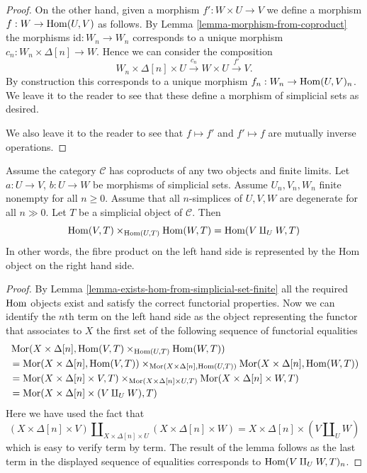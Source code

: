 \begin{proof}
\medskip\noindent
On the other hand, given a morphism
$f' : W \times U \to V$ we define
a morphism $f : W \to \mathop{\mathrm{Hom}}\nolimits(U, V)$
as follows. By Lemma \ref{lemma-morphism-from-coproduct} the morphisms
$\text{id} : W_n \to W_n$ corresponds to a unique
morphism $c_n : W_n \times \Delta[n] \to W$.
Hence we can consider the composition
$$
W_n \times \Delta[n] \times U
\xrightarrow{c_n}
W \times U
\xrightarrow{f'}
V.
$$
By construction this corresponds to a unique morphism
$f_n : W_n \to \mathop{\mathrm{Hom}}\nolimits(U, V)_n$. We leave it to the reader
to see that these define a morphism of simplicial sets as
desired.

\medskip\noindent
We also leave it to the reader to see that
$f \mapsto f'$ and $f' \mapsto f$ are mutually inverse
operations.
\end{proof}

\begin{lemma}
\label{lemma-hom-from-coprod}
Assume the category $\mathcal{C}$
has coproducts of any two objects and finite
limits. Let $a : U \to V$, $b : U \to W$
be morphisms of simplicial sets.
Assume $U_n, V_n, W_n$ finite nonempty for all $n \geq 0$.
Assume that all $n$-simplices of $U, V, W$
are degenerate for all $n \gg 0$.
Let $T$ be a simplicial object of $\mathcal{C}$.
Then
$$
\mathop{\mathrm{Hom}}\nolimits(V, T) \times_{\mathop{\mathrm{Hom}}\nolimits(U, T)} \mathop{\mathrm{Hom}}\nolimits(W, T)
=
\mathop{\mathrm{Hom}}\nolimits(V \amalg_U W, T)
$$
In other words, the fibre product on the left hand
side is represented by the Hom object on the right hand side.
\end{lemma}

\begin{proof}
By Lemma \ref{lemma-exists-hom-from-simplicial-set-finite}
all the required $\mathop{\mathrm{Hom}}\nolimits$ objects exist and satisfy the
correct functorial properties. Now we can identify
the $n$th term on the left hand side as the object
representing the functor that associates to $X$
the first set of the following sequence of functorial
equalities
\begin{align*}
&
\mathop{\mathrm{Mor}}\nolimits(X \times \Delta[n],
\mathop{\mathrm{Hom}}\nolimits(V, T) \times_{\mathop{\mathrm{Hom}}\nolimits(U, T)} \mathop{\mathrm{Hom}}\nolimits(W, T)) \\
& =
\mathop{\mathrm{Mor}}\nolimits(X \times \Delta[n], \mathop{\mathrm{Hom}}\nolimits(V, T))
\times_{\mathop{\mathrm{Mor}}\nolimits(X \times \Delta[n], \mathop{\mathrm{Hom}}\nolimits(U, T))}
\mathop{\mathrm{Mor}}\nolimits(X \times \Delta[n], \mathop{\mathrm{Hom}}\nolimits(W, T)) \\
& =
\mathop{\mathrm{Mor}}\nolimits(X \times \Delta[n] \times V, T)
\times_{\mathop{\mathrm{Mor}}\nolimits(X \times \Delta[n] \times U, T)}
\mathop{\mathrm{Mor}}\nolimits(X \times \Delta[n] \times W, T) \\
& =
\mathop{\mathrm{Mor}}\nolimits(X \times \Delta[n] \times (V \amalg_U W), T)
\end{align*}
Here we have used the fact that
$$
(X \times \Delta[n] \times V)
\amalg_{X \times \Delta[n] \times U}
(X \times \Delta[n] \times W)
=
X \times \Delta[n] \times (V \amalg_U W)
$$
which is easy to verify term by term. The result of the lemma
follows as the last term in the displayed sequence of
equalities corresponds to $\mathop{\mathrm{Hom}}\nolimits(V \amalg_U W, T)_n$.
\end{proof}














